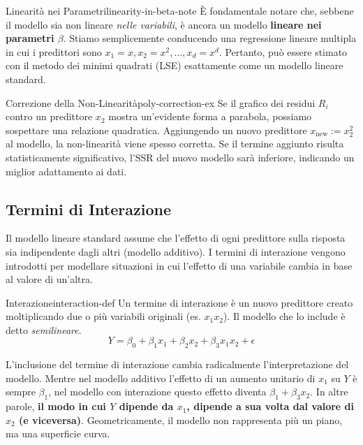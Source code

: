 \begin{nota}{Linearità nei Parametri}{linearity-in-beta-note}
È fondamentale notare che, sebbene il modello sia non lineare \textit{nelle
variabili}, è ancora un modello \textbf{lineare nei parametri \(\beta\)}.
Stiamo semplicemente conducendo una regressione lineare multipla in cui i
predittori sono \(x_1=x, x_2=x^2, \dots, x_d=x^d\). Pertanto, può essere
stimato con il metodo dei minimi quadrati (LSE) esattamente come un modello
lineare standard.
\end{nota}

\begin{esempio}{Correzione della Non-Linearità}{poly-correction-ex}
Se il grafico dei residui \(R_i\) contro un predittore \(x_2\) mostra
un'evidente forma a parabola, possiamo sospettare una relazione quadratica.
Aggiungendo un nuovo predittore \(x_{\text{new}} := x_2^2\) al modello, la
non-linearità viene spesso corretta. Se il termine aggiunto risulta
statisticamente significativo, l'SSR del nuovo modello sarà inferiore,
indicando un miglior adattamento ai dati.
\end{esempio}

\subsection{Termini di Interazione}
Il modello lineare standard assume che l'effetto di ogni predittore sulla
risposta sia indipendente dagli altri (modello additivo). I termini di
interazione vengono introdotti per modellare situazioni in cui l'effetto di una
variabile cambia in base al valore di un'altra.

\begin{definizione}{Interazione}{interaction-def}
Un termine di interazione è un nuovo predittore creato moltiplicando due o più
variabili originali (es. \(x_1 x_2\)). Il modello che lo include è detto
\textit{semilineare}.
\[ Y = \beta_0 + \beta_1 x_1 + \beta_2 x_2 + \beta_3 x_1 x_2 + \epsilon \]
\end{definizione}

L'inclusione del termine di interazione cambia radicalmente l'interpretazione
del modello. Mentre nel modello additivo l'effetto di un aumento unitario di
\(x_1\) su \(Y\) è sempre \(\beta_1\), nel modello con interazione questo
effetto diventa \(\beta_1 + \beta_3 x_2\). In altre parole, \textbf{il modo in
cui \(Y\) dipende da \(x_1\), dipende a sua volta dal valore di \(x_2\) (e
viceversa)}. Geometricamente, il modello non rappresenta più un piano, ma una
superficie curva.

